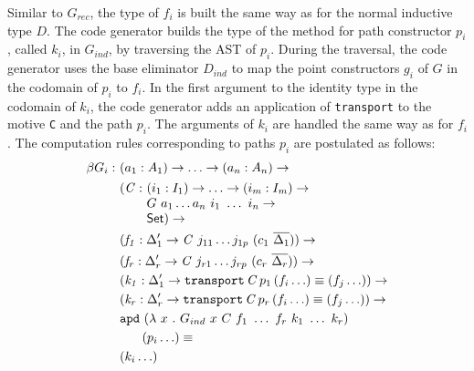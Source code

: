 \documentclass[sigplan,10pt]{acmart}
\begin{document}
Similar to $G_{rec}$, the type of $f_i$ is built the same way as for the normal inductive type $D$.
The code generator builds the type of the method for path constructor $p_i$, called $k_i$, in $G_{ind}$, by traversing the AST of $p_i$. During the traversal, the code generator uses the base eliminator $D_{ind}$ to map the point constructors $g_i$ of $G$ in the codomain of $p_i$ to $f_i$. In the first argument to the identity type in the codomain of $k_i$, the code generator adds an application of  {\tt transport} to the motive {\tt C} and the path $p_i$. The arguments of $k_i$ are handled the same way as for $f_i$.
The computation rules corresponding to paths $p_i$ are postulated as follows:
\begin{align*}
\beta G_i :\ & (a_1 : A_1) \to \ldots \to (a_n : A_n) \to\\
& \begin{array}{@{}l@{}l}(\mathit{C} :\ & (i_1 : I_1) \to \ldots \to (i_m : I_m) \to\\  & G\ a_1 \ldots a_n\ i_1\ \ldots\ i_n \to\\ &\SET{})\to\end{array} \\
& (\mathit{f_1} : \Delta_1^\prime \to \mathit{C}\ j_{11} \ldots j_{1p}\ (c_1\ \overline{\Delta_1})) \to \\
& (\mathit{f_r} : \Delta_r^\prime \to \mathit{C}\ j_{r1} \ldots j_{rp}\ (c_r\ \overline{\Delta_r})) \to \\
& (\mathit{k_1} : \Delta_1^\prime \to \texttt{transport} \, \mathit{C} \, p_1 \, (f_i \ldots) \equiv (f_j \ldots)) \to \\
& (\mathit{k_r} : \Delta_r^\prime \to \texttt{transport} \, \mathit{C} \, p_r \, (f_i \ldots) \equiv (f_j \ldots)) \to \\
& \texttt{apd} \  (\lambda \  x\ .\ G_{ind} \  x \  C \  f_1 \ \ldots\ f_r \  k_1 \ \ldots\ k_r)\\
&\hspace{0.5cm} \  (p_i \ldots) \equiv\\
& (k_i \ldots)
\end{align*}

\end{document}
